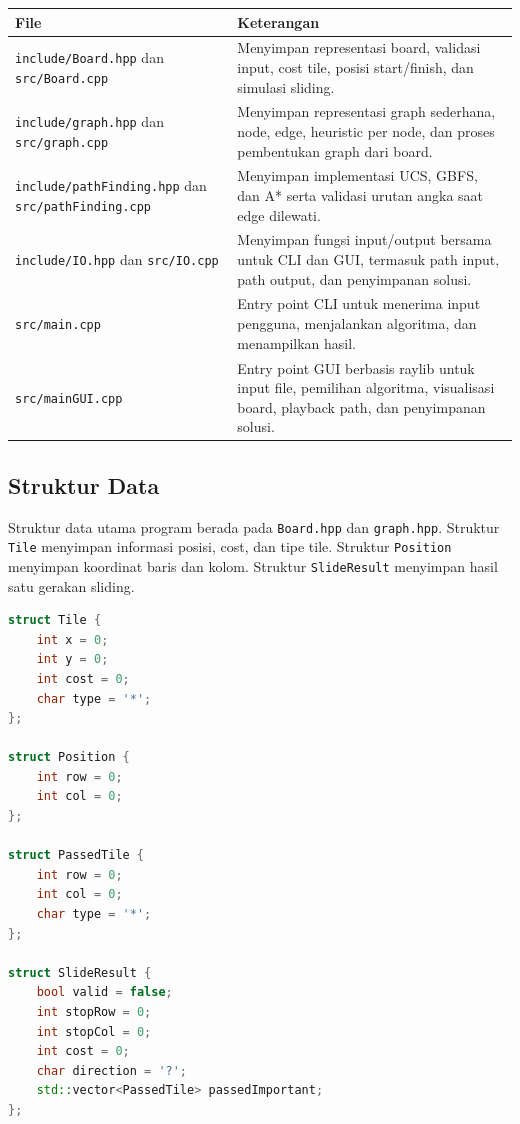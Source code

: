 \documentclass[a4paper,11pt]{article}
\begin{document}
\begin{longtable}{|p{4cm}|p{10cm}|}
    \hline
    \textbf{File} & \textbf{Keterangan} \\
    \hline
    \endhead
    \texttt{include/Board.hpp} dan \texttt{src/Board.cpp} & Menyimpan representasi board, validasi input, cost tile, posisi start/finish, dan simulasi sliding. \\
    \hline
    \texttt{include/graph.hpp} dan \texttt{src/graph.cpp} & Menyimpan representasi graph sederhana, node, edge, heuristic per node, dan proses pembentukan graph dari board. \\
    \hline
    \texttt{include/pathFinding.hpp} dan \texttt{src/pathFinding.cpp} & Menyimpan implementasi UCS, GBFS, dan A* serta validasi urutan angka saat edge dilewati. \\
    \hline
    \texttt{include/IO.hpp} dan \texttt{src/IO.cpp} & Menyimpan fungsi input/output bersama untuk CLI dan GUI, termasuk path input, path output, dan penyimpanan solusi. \\
    \hline
    \texttt{src/main.cpp} & Entry point CLI untuk menerima input pengguna, menjalankan algoritma, dan menampilkan hasil. \\
    \hline
    \texttt{src/mainGUI.cpp} & Entry point GUI berbasis raylib untuk input file, pemilihan algoritma, visualisasi board, playback path, dan penyimpanan solusi. \\
    \hline
\end{longtable}

\subsection{Struktur Data}
Struktur data utama program berada pada \texttt{Board.hpp} dan \texttt{graph.hpp}. Struktur \texttt{Tile} menyimpan informasi posisi, cost, dan tipe tile. Struktur \texttt{Position} menyimpan koordinat baris dan kolom. Struktur \texttt{SlideResult} menyimpan hasil satu gerakan sliding.

\begin{lstlisting}[language=C++, caption=Struktur Data Board]
struct Tile {
    int x = 0;
    int y = 0;
    int cost = 0;
    char type = '*';
};

struct Position {
    int row = 0;
    int col = 0;
};

struct PassedTile {
    int row = 0;
    int col = 0;
    char type = '*';
};

struct SlideResult {
    bool valid = false;
    int stopRow = 0;
    int stopCol = 0;
    int cost = 0;
    char direction = '?';
    std::vector<PassedTile> passedImportant;
};
\end{lstlisting}
\end{document}
